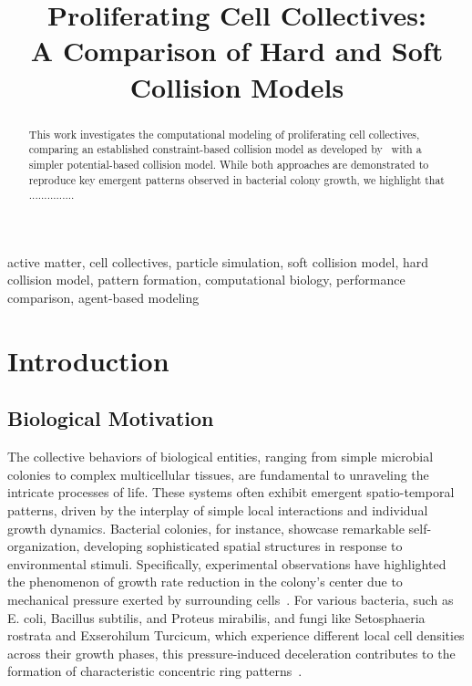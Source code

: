 \documentclass[conference]{IEEEtran}
\begin{document}
\title{Proliferating Cell Collectives: \\A Comparison of Hard and Soft Collision Models}

\author{
}

\maketitle

\begin{abstract}
    This work investigates the computational modeling of proliferating cell collectives, comparing an established constraint-based collision model as developed by~\cite{Weady2024} with a simpler potential-based collision model. While both approaches are demonstrated to reproduce key emergent patterns observed in bacterial colony growth, we highlight that ...............

\end{abstract}

\begin{IEEEkeywords}
    active matter, cell collectives, particle simulation, soft collision model, hard collision model, pattern formation, computational biology, performance comparison, agent-based modeling
\end{IEEEkeywords}

\section{Introduction}
\subsection{Biological Motivation}

The collective behaviors of biological entities, ranging from simple microbial colonies to complex multicellular tissues, are fundamental to unraveling the intricate processes of life. These systems often exhibit emergent spatio-temporal patterns, driven by the interplay of simple local interactions and individual growth dynamics. Bacterial colonies, for instance, showcase remarkable self-organization, developing sophisticated spatial structures in response to environmental stimuli. Specifically, experimental observations have highlighted the phenomenon of growth rate reduction in the colony's center due to mechanical pressure exerted by surrounding cells~\cite{Wittmann2023}. For various bacteria, such as E. coli, Bacillus subtilis, and Proteus mirabilis, and fungi like Setosphaeria rostrata and Exserohilum Turcicum, which experience different local cell densities across their growth phases, this pressure-induced deceleration contributes to the formation of characteristic concentric ring patterns~\cite{YAMAZAKI2005136}.
\end{document}
